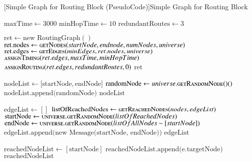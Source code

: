 \begin{breakablealgorithm}
	[Simple Graph for Routing Block (PseudoCode)]{Simple Graph for Routing Block}\label{alg:simpleGraph}
	\begin{algorithmic}[1]
		\label{alg:getRoutingGraph-line}
			\State $\text{maxTime} \gets 3000$
			\State $\text{minHopTime} \gets 10$
			\State $\text{redundantRoutes} \gets 3$
			\item[]
			\State $\text{ret} \gets \text{new RoutingGraph}()$
			\State $\text{ret.nodes} \gets \Call{getNodes}{startNode, endnode, numNodes, universe}$
			\State $\text{ret.edges} \gets \Call{getEdges}{minEdges, ret.nodes, universe}$
			\State $\Call{assignTiming}{ret.edges, maxTime,minHopTime}$
			\State $\Call{assignRouting}{ret.edges, redundantRoutes, 0}$
			\Return $\text{ret}$	
		\EndFunction
		\item[]		
		\label{alg:getNodes-line}
		  \State $\text{nodeList} \gets \lbrack\text{startNode}, \text{endNode}\rbrack$
		  	\State $\text{randomNode} \gets universe.\Call{getRandomNode()}$
		  		\State $\text{nodeList.append(randomNode)}$ 
		  	\EndIf	
		  \EndWhile{}	
		  \Return $\text{nodeList}$
		\EndFunction  
		\item[]
		\label{alg:getEdges-line}
		    \State $\text{edgeList} \gets []$
				\State $\text{listOfReachedNodes} \gets \Call{getReachedNodes}{nodes, edgeList}$
				\State $\text{startNode} \gets \Call{universe.getRandomNode}{listOfReachedNodes}$
				\State $\text{endNode} \gets \Call{universe.getRandomNode}{listOfAllNodes-[startNode]}$
				\State $\text{edgeList.append(new Message(startNode, endNode))}$
			\EndWhile{}
			\Return $\text{edgeList}$
		\EndFunction
		\item[]
		\label{alg:getReachedNodes-line}
			\State $\text{reachedNodeList} \gets [\text{startNode}]$
					\State $\text{reachedNodeList.append(e.targetNode)}$
				\EndIf
			\EndFor
			\Return $\text{reachedNodeList}$
		\EndFunction
	\end{algorithmic}
\end{breakablealgorithm}


